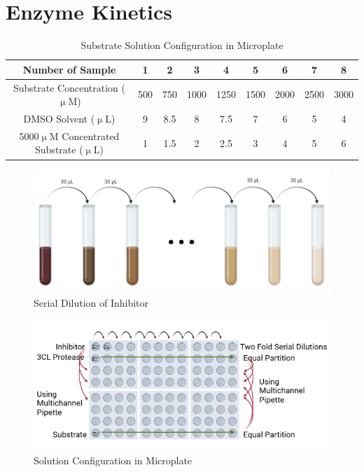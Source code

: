 \documentclass{report}
\begin{document}
\section{Enzyme Kinetics}
\begin{table}
    \centering
    \caption{Substrate Solution Configuration in Microplate}
    
    \begin{tabular}{|c|c|c|c|c|c|c|c|c|} \hline
        Number of Sample&1&2&3&4&5&6&7&8 \\ \hline
        Substrate Concentration ($\upmu$M)&500&750&1000&1250&1500&2000&2500&3000 \\ \hline
        DMSO Solvent ($\upmu$L)& 9&8.5&8&7.5&7&6&5&4\\ \hline
        5000$\upmu$M Concentrated Substrate ($\upmu$L)&1&1.5&2&2.5&3&4&5&6 \\ \hline
    \end{tabular}
    \label{Substrate Solution Configuration in Microplate}
\end{table}
\begin{figure}
    \centering
    \includegraphics[width=0.7\linewidth]{../Figures/serial dilution.png}
    \caption{Serial Dilution of Inhibitor}
    \label{Serial Dilution of Inhibitor}
\end{figure}
\begin{figure}
    \centering
    \includegraphics[width=1\linewidth]{../Figures/microplate.png}
    \caption{Solution Configuration in Microplate}
    \label{Inhibitor Solution Configuration in Microplate}
\end{figure}
\end{document}
